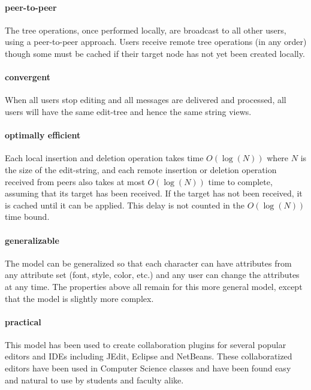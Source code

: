 \documentclass{amsart}
\begin{document}
\paragraph{\bf peer-to-peer}
The tree operations, once performed locally, are broadcast
to all other users, using a peer-to-peer approach.
Users receive remote tree operations (in any order) though some must
be cached if their target node has not yet been created locally.

\paragraph{\bf convergent} 
When all users stop editing and all messages are delivered and processed, all
users will have the same edit-tree and hence the same string
views.

\paragraph{\bf optimally efficient}
Each local insertion and deletion operation takes time $O(\log(N))$ where $N$ is the size of the edit-string, and each remote insertion or deletion operation received from peers also takes at most $O(\log(N))$  time to complete, assuming that its target has been received.  If the target has not been received, it is cached until it can be applied. This delay is not counted in the $O(\log(N))$ time bound.

\paragraph{\bf generalizable}
The model can be generalized so that each character can have attributes
from any attribute set (font, style, color, etc.) and any user can change the
attributes at any time. The properties above 
all remain for this more general model, except that the model is slightly
more complex.

\paragraph{\bf practical} 
This model has been used to create collaboration plugins for several
popular editors and IDEs including JEdit, Eclipse and NetBeans. These
collaboratized editors have been used in Computer Science classes
and have been found easy and natural to use by students and faculty
alike.
\end{document}
